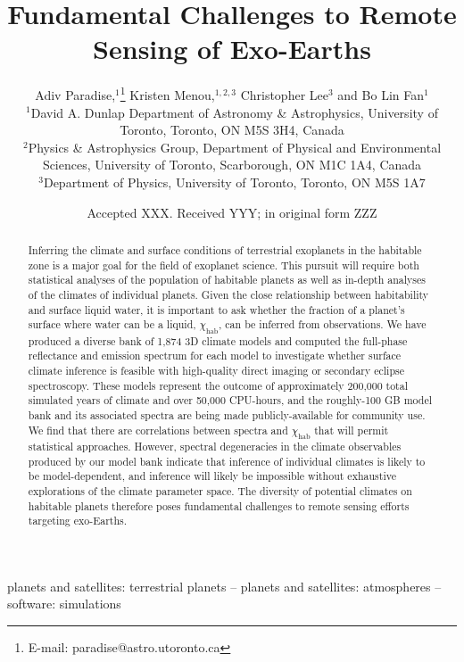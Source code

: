 \documentclass[fleqn,usenatbib]{mnras}
\title[Challenges to Remote Sensing]{Fundamental Challenges to Remote Sensing of Exo-Earths}
\author[Paradise et al.]{
Adiv Paradise,$^{1}$\thanks{E-mail: paradise@astro.utoronto.ca}
Kristen Menou,$^{1,2,3}$
Christopher Lee$^{3}$
and Bo Lin Fan$^{1}$
\\
$^{1}$David A. Dunlap Department of Astronomy \& Astrophysics, University of Toronto, Toronto, ON M5S 3H4, Canada\\
$^{2}$Physics \& Astrophysics Group, Department of Physical and Environmental Sciences, University of Toronto, Scarborough, ON M1C 1A4, Canada\\
$^{3}$Department of Physics, University of Toronto, Toronto, ON M5S 1A7
}
\date{Accepted XXX. Received YYY; in original form ZZZ}
\begin{document}
\label{firstpage}
\pagerange{\pageref{firstpage}--\pageref{lastpage}}
\maketitle

\begin{abstract}
Inferring the climate and surface conditions of terrestrial exoplanets in the habitable zone is a major goal for the field of exoplanet science. This pursuit will require both statistical analyses of the population of habitable planets as well as in-depth analyses of the climates of individual planets. Given the close relationship between habitability and surface liquid water, it is important to ask whether the fraction of a planet's surface where water can be a liquid, $\chi_\text{hab}$, can be inferred from observations. We have produced a diverse bank of 1,874 3D climate models and computed the full-phase reflectance and emission spectrum for each model to investigate whether surface climate inference is feasible with high-quality direct imaging or secondary eclipse spectroscopy. These models represent the outcome of approximately 200,000 total simulated years of climate and over 50,000 CPU-hours, and the roughly-100 GB model bank and its associated spectra are being made publicly-available for community use. We find that there are correlations between spectra and $\chi_\text{hab}$ that will permit statistical approaches. However, spectral degeneracies in the climate observables produced by our model bank indicate that inference of individual climates is likely to be model-dependent, and inference will likely be impossible without exhaustive explorations of the climate parameter space. The diversity of potential climates on habitable planets therefore poses fundamental challenges to remote sensing efforts targeting exo-Earths.
\end{abstract}

\begin{keywords}
planets and satellites: terrestrial planets -- planets and satellites: atmospheres -- software: simulations
\end{keywords}
\end{document}
